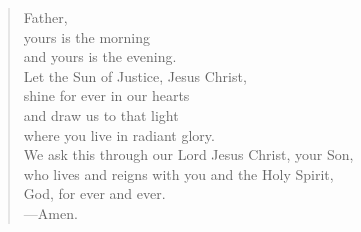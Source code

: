 \prayer

\setlength{\vleftmargin}{\prayerleftmargini}

\begin{verse}
Father,\\
yours is the morning\\
and yours is the evening.\\
Let the Sun of Justice, Jesus Christ,\\
shine for ever in our hearts\\
and draw us to that light\\
where you live in radiant glory.\\
We ask this through our Lord Jesus Christ, your Son,\\
who lives and reigns with you and the Holy Spirit,\\
God, for ever and ever.\\
{\color{red}---\thinspace}Amen.
\end{verse}

\setlength{\vleftmargin}{\defleftmargini}